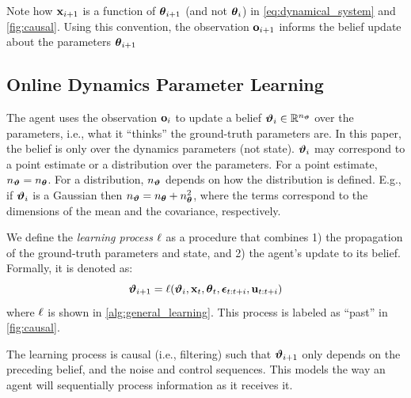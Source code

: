 Note how $\mathbf{x}_{i+1}$ is a function of $\boldsymbol{\theta}_{i+1}$ (and not $\boldsymbol{\theta}_i$) in \cref{eq:dynamical_system} and \cref{fig:causal}.
Using this convention, the observation $\mathbf{o}_{i+1}$ informs the belief update about the parameters $\boldsymbol{\theta}_{i+1}$

\subsection{Online Dynamics Parameter Learning}

The agent uses the observation $\mathbf{o}_i$ to update a belief $\boldsymbol{{\vartheta}}_i \in \mathbb{R}^{n_{\boldsymbol{{\vartheta}}}}$  over the parameters, i.e., what it ``thinks'' the ground-truth parameters are.
In this paper, the belief is only over the dynamics parameters (not state). 
$\boldsymbol{{\vartheta}}_i$ may correspond to a point estimate or a distribution over the parameters.
For a point estimate, $n_{\boldsymbol{{\vartheta}}} = n_{\boldsymbol{\theta}}$. 
For a distribution, $n_{\boldsymbol{{\vartheta}}}$ depends on how the distribution is defined. 
E.g., if $\boldsymbol{{\vartheta}}_i$ is a Gaussian then $n_{\boldsymbol{{\vartheta}}} = n_{\boldsymbol{\theta}} + n_{\boldsymbol{\theta}}^2$, where the terms correspond to the dimensions of the mean and the covariance, respectively.

We define the \textit{learning process} $\mathbf{\ell}$ as a procedure that combines 1) the propagation of the ground-truth parameters and state, and 2) the agent's update to its belief.
Formally, it is denoted as:
\begin{equation}
\label{eq:learning_process}
    \boldsymbol{{\vartheta}}_{i+1} = \mathbf{\ell}(\boldsymbol{{\vartheta}}_i, \mathbf{x}_t, \boldsymbol{\theta}_{t}, \boldsymbol{\epsilon}_{t:t+i}, \mathbf{u}_{t:t + i})
\end{equation}
where $\mathbf{\ell}$ is shown in \cref{alg:general_learning}.
This process is labeled as ``past'' in \cref{fig:causal}.

The learning process is causal (i.e., filtering) such that $\boldsymbol{{\vartheta}}_{i+1}$ only depends on the preceding belief, and the noise and control sequences.
This models the way an agent will sequentially process information as it receives it.

